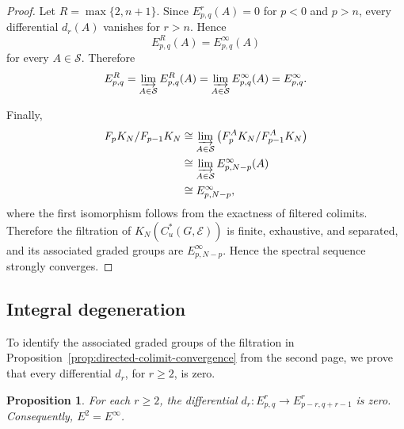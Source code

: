 \documentclass[pdflatex,sn-mathphys-num]{sn-jnl}%
\theoremstyle{plain}
\newtheorem{proposition}[theorem]{Proposition}
\theoremstyle{remark}
\theoremstyle{definition}
\numberwithin{equation}{section}
\begin{document}
\begin{proof}
Let \( R=\max\{2,n+1\} \). Since \( E^r_{p,q}(A)=0 \) for \( p<0 \) and \( p>n \), every differential \( d_r(A) \) vanishes for \( r>n \). Hence
\[
E^R_{p,q}(A)
=
E^\infty_{p,q}(A)
\]
for every \( A\in\mathcal S \). Therefore
\[
E^R_{p,q}
=
\varinjlim_{A\in\mathcal S}E^R_{p,q}(A)
=
\varinjlim_{A\in\mathcal S}E^\infty_{p,q}(A)
=
E^\infty_{p,q}.
\]

Finally,
\[
\begin{aligned}
F_pK_N/F_{p-1}K_N
&\cong
\varinjlim_{A\in\mathcal S}
\left(
F_p^AK_N/F_{p-1}^AK_N
\right)\\
&\cong
\varinjlim_{A\in\mathcal S}
E^\infty_{p,N-p}(A)\\
&\cong
E^\infty_{p,N-p},
\end{aligned}
\]
where the first isomorphism follows from the exactness of filtered colimits. Therefore the filtration of \( K_N(C_u^*(G,\mathcal E)) \) is finite, exhaustive, and separated, and its associated graded groups are \( E^\infty_{p,N-p} \). Hence the spectral sequence strongly converges.
\end{proof}

\subsection{Integral degeneration}

To identify the associated graded groups of the filtration in Proposition~\ref{prop:directed-colimit-convergence} from the second page, we prove that every differential \( d_r \), for \( r\geq2 \), is zero.

\begin{proposition}
\label{prop:integral-degeneration}
For each \( r\geq2 \), the differential \( d_r\colon E^r_{p,q}\to E^r_{p-r,q+r-1} \) is zero. Consequently, \( E^2=E^\infty \).
\end{proposition}
\end{document}
